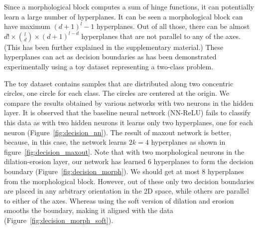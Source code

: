 \documentclass{bmvc2k}
\def\figref#1{figure~\ref{#1}}
\def\Figref#1{Figure~\ref{#1}}
\begin{document}
Since a morphological block computes a sum of hinge functions, it can potentially learn a large number of hyperplanes. It can be seen a morphological block can have maximum  $(d+1)^l-1$ hyperplanes. Out of all those, there can be almost $d! \times \binom{l}{d} \times {(d+1)^{l-d}}$ hyperplanes that are not parallel to any of the axes. (This has been further explained in the supplementary material.) These hyperplanes can act as decision boundaries as has been demonstrated experimentally using a toy dataset representing a two-class problem. 

The toy dataset contains samples that are distributed along two concentric circles, one circle for each class. The circles are centered at the origin.
We compare the results obtained by various networks with two neurons in the hidden layer. It is observed that the baseline neural network (NN-ReLU) fails to classify this data as with two hidden neurons it learns only two hyperplanes, one for each neuron (\Figref{fig:decision_nn}).
The result of maxout network\cite{goodfellow_maxout_2013} is better, because, in this case, the network learns $2k = 4$ hyperplanes as shown in \figref{fig:decision_maxout}. 
Note that with two morphological neurons in the dilation-erosion layer, our network has learned 6 hyperplanes to form the decision boundary (\Figref{fig:decision_morph}). We should get at most 8 hyperplanes from the morphological block. However, out of these only two decision boundaries are placed in any arbitrary orientation in the 2D space, while others are parallel to either of the axes. Whereas using the soft version of dilation and erosion smooths the boundary, making it aligned with the data (\Figref{fig:decision_morph_soft}). 
\end{document}

